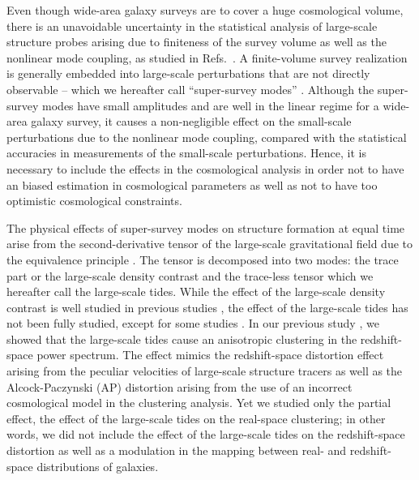 \documentclass[prd,onecolumn,notitlepage,amsmath,amssymb,floatfix,superscriptaddress]{revtex4-1}
\begin{document}
Even though wide-area galaxy surveys are to cover a huge cosmological volume, there is an unavoidable uncertainty in the statistical analysis of large-scale structure probes arising due to finiteness of the survey volume as well as the nonlinear mode coupling, as studied in Refs.~\cite{TakadaHu:13,Hamiltonetal:06,Sefusattietal:06,TakadaBridle:07,TakadaJain:09,Satoetal:09,Baldaufetal:11,SherwinZaldarriaga:12,dePutteretal:12,TakadaSpergel:13,Schaanetal:14,Lietal:14a,Lietal:14b,Takahashietal:14,Manzottietal:14,CarronSzapudi:15,Daietal:15,Shirasakietal:17,Lietal:16,IpSchmidt:17,Akitsuetal:17,BarreiraSchmidt:17a}.
A finite-volume survey realization is generally embedded into large-scale perturbations that are not directly observable -- which we hereafter call ``super-survey modes'' \citep{TakadaHu:13,CarronSzapudi:15}. Although the super-survey modes have small amplitudes and are well in the linear regime for a wide-area galaxy survey, it causes a non-negligible effect on the small-scale perturbations due to the nonlinear mode coupling, compared with the statistical accuracies in measurements of the small-scale perturbations. Hence, it is necessary to include the effects in the cosmological analysis \citep[e.g.][]{Kuraseetal:17} in order not to have an biased estimation in cosmological parameters as well as not to have too optimistic cosmological constraints. 

The physical effects of super-survey modes on structure formation at equal time arise from the second-derivative tensor of the large-scale gravitational field 
due to the equivalence principle \citep{Baldaufetal:11,Akitsuetal:17}. The tensor is decomposed into two modes: the trace part or 
the large-scale density contrast and the trace-less tensor which we hereafter call
the large-scale tides. While the effect of the large-scale density contrast is well studied in previous studies \citep[e.g.][]{TakadaHu:13}, 
the effect of the large-scale tides has not been fully studied, except for some studies \citep{Schmidtetal:14,Daietal:15,IpSchmidt:17,Akitsuetal:17,BarreiraSchmidt:17a}. In our previous 
study \cite{Akitsuetal:17}, we showed that the large-scale tides cause an anisotropic clustering in the redshift-space power spectrum. 
The effect mimics the redshift-space distortion effect \cite{Kaiser:87,Hamilton:98} arising from the peculiar velocities of large-scale structure tracers as well as the 
Alcock-Paczynski (AP) distortion \cite{AlcockPaczynski:79,SeoEisenstein:03,HuHaiman:03} arising from the use of an incorrect cosmological model in the clustering analysis. Yet we studied only the partial effect,  the effect of the large-scale tides on the real-space clustering; in other words, we did not include the effect of the large-scale tides on the redshift-space distortion as well as a modulation in the mapping between real- and redshift-space distributions of galaxies.
\end{document}

